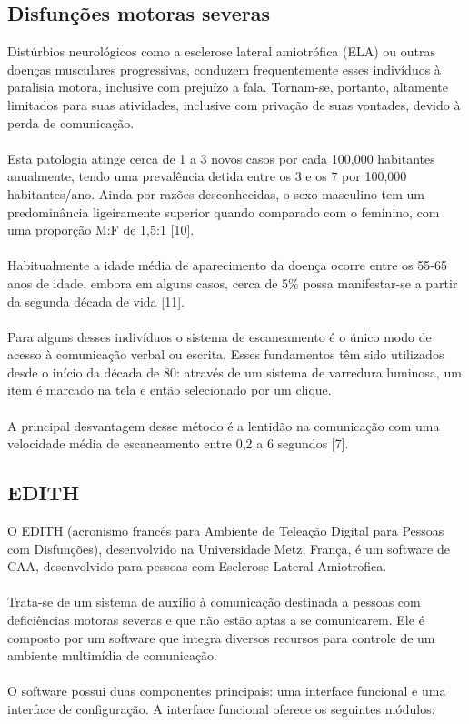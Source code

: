 \documentclass[twoside]{article}
\begin{document}
\begin{multicols}{2}
\subsection{Disfunções motoras severas}
Distúrbios neurológicos como a esclerose lateral amiotrófica (ELA) ou outras doenças musculares progressivas, conduzem frequentemente esses indivíduos à paralisia motora, inclusive com prejuízo a fala. Tornam-se, portanto, altamente limitados para suas atividades, inclusive com privação de suas vontades, devido à perda de comunicação.
\\\\
Esta patologia atinge cerca de 1 a 3 novos casos por cada 100,000 habitantes anualmente, tendo uma prevalência detida entre os 3 e os 7 por 100,000 habitantes/ano. Ainda por razões desconhecidas, o sexo masculino tem um predominância ligeiramente superior quando comparado com o feminino, com uma proporção M:F de 1,5:1 [10]. 
\\\\
Habitualmente a idade média de aparecimento da doença ocorre entre os 55-65 anos de idade, embora em  alguns casos, cerca de 5\% possa manifestar-se a partir da segunda década de vida [11].
\\\\
Para alguns desses indivíduos o sistema de escaneamento é o único modo de acesso à comunicação verbal ou escrita. Esses fundamentos têm sido utilizados desde o início da década de 80: através de um sistema de varredura luminosa, um item é marcado na tela e então selecionado por um clique.
\\\\
A principal desvantagem desse método é a lentidão na comunicação com uma velocidade média de escaneamento entre 0,2 a 6 segundos [7].

\subsection{EDITH}
O EDITH (acronismo francês para Ambiente de Teleação Digital para Pessoas com Disfunções), desenvolvido na Universidade Metz, França, é um software de CAA, desenvolvido para pessoas com Esclerose Lateral Amiotrofica.
\noindent \\\\Trata-se de um sistema de auxílio à comunicação destinada a pessoas com deficiências motoras severas e que não estão aptas a se comunicarem. Ele é composto por um software que integra diversos recursos para controle de um ambiente multimídia de comunicação. 
\noindent \\\\O software possui duas componentes principais: uma interface funcional e uma interface de configuração. A interface funcional oferece os seguintes módulos:


\end{multicols}
\end{document}
